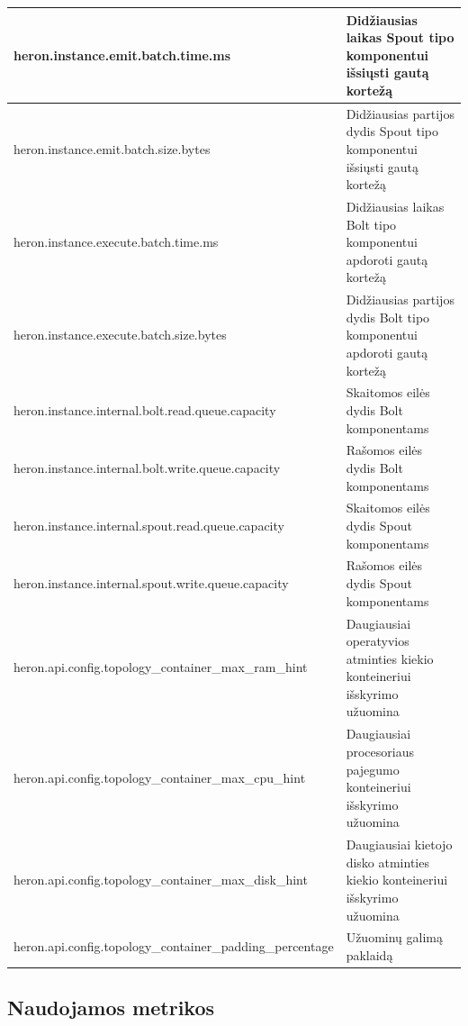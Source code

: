 \documentclass{VUMIFPSbakalaurinis}
\begin{document}
\begin{longtable}{|p{0.59\linewidth}|p{0.41\linewidth}|}
    heron.instance.emit.batch.time.ms                                     & Didžiausias laikas Spout tipo komponentui išsiųsti gautą kortežą               \\ \hline
    heron.instance.emit.batch.size.bytes                                  & Didžiausias partijos dydis Spout tipo komponentui išsiųsti gautą kortežą       \\ \hline
    heron.instance.execute.batch.time.ms                                  & Didžiausias laikas Bolt tipo komponentui apdoroti gautą kortežą                \\ \hline
    heron.instance.execute.batch.size.bytes                               & Didžiausias partijos dydis Bolt tipo komponentui apdoroti gautą kortežą        \\ \hline
    heron.instance.internal.bolt.read.queue.capacity                      & Skaitomos eilės dydis Bolt komponentams                                        \\ \hline
    heron.instance.internal.bolt.write.queue.capacity                     & Rašomos eilės dydis Bolt komponentams                                          \\ \hline
    heron.instance.internal.spout.read.queue.capacity                     & Skaitomos eilės dydis Spout komponentams                                       \\ \hline
    heron.instance.internal.spout.write.queue.capacity                    & Rašomos eilės dydis Spout komponentams                                         \\ \hline
    heron.api.config.topology\_container\_max\_ram\_hint                  & Daugiausiai operatyvios atminties kiekio konteineriui išskyrimo užuomina       \\ \hline
    heron.api.config.topology\_container\_max\_cpu\_hint                  & Daugiausiai procesoriaus pajegumo konteineriui išskyrimo užuomina              \\ \hline
    heron.api.config.topology\_container\_max\_disk\_hint                 & Daugiausiai kietojo disko atminties kiekio konteineriui  išskyrimo užuomina    \\ \hline
    heron.api.config.topology\_container\_padding\_percentage             & Užuominų galimą paklaidą                                                       \\ \hline
\end{longtable}

\subsection{Naudojamos metrikos}
\end{document}
